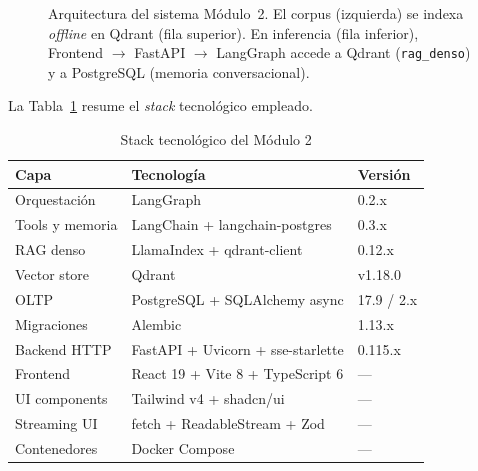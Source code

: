 \documentclass[conference]{IEEEtran}
\newcommand{\code}[1]{\texttt{\small #1}}
\begin{document}
\begin{figure}[ht]
\caption{Arquitectura del sistema Módulo~2. El corpus (izquierda) se indexa
\textit{offline} en Qdrant (fila superior). En inferencia (fila inferior),
Frontend $\to$ FastAPI $\to$ LangGraph accede a Qdrant (\code{rag\_denso})
y a PostgreSQL (memoria conversacional).}
\label{fig:arq}
\end{figure}

La Tabla~\ref{tab:stack} resume el \textit{stack} tecnológico empleado.

\begin{table}[ht]
\centering
\caption{Stack tecnológico del Módulo 2}
\label{tab:stack}
\setlength{\tabcolsep}{3.5pt}
\begin{tabular}{@{}lll@{}}
\toprule
\textbf{Capa} & \textbf{Tecnología} & \textbf{Versión} \\
\midrule
Orquestación   & LangGraph                         & 0.2.x      \\
Tools y memoria& LangChain + langchain-postgres    & 0.3.x      \\
RAG denso      & LlamaIndex + qdrant-client        & 0.12.x     \\
Vector store   & Qdrant                            & v1.18.0    \\
OLTP           & PostgreSQL + SQLAlchemy async     & 17.9 / 2.x \\
Migraciones    & Alembic                           & 1.13.x     \\
Backend HTTP   & FastAPI + Uvicorn + sse-starlette & 0.115.x    \\
Frontend       & React 19 + Vite 8 + TypeScript 6  & —          \\
UI components  & Tailwind v4 + shadcn/ui           & —          \\
Streaming UI   & fetch + ReadableStream + Zod      & —          \\
Contenedores   & Docker Compose                    & —          \\
\bottomrule
\end{tabular}
\end{table}
\end{document}
